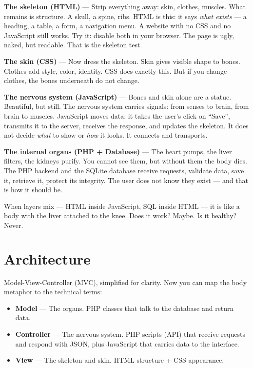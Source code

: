 \documentclass[11pt,a4paper,oneside]{book}
\providecommand{\tightlist}{%
  \setlength{\itemsep}{0pt}\setlength{\parskip}{0pt}}
\begin{document}
\textbf{The skeleton (HTML)} --- Strip everything away: skin,
clothes, muscles. What remains is structure. A skull, a spine,
ribs. HTML is this: it says \emph{what exists} --- a heading, a
table, a form, a navigation menu. A website with no CSS and no
JavaScript still works. Try it: disable both in your browser. The
page is ugly, naked, but readable. That is the skeleton test.

\textbf{The skin (CSS)} --- Now dress the skeleton. Skin gives
visible shape to bones. Clothes add style, color, identity. CSS
does exactly this. But if you change clothes, the bones
underneath do not change.

\textbf{The nervous system (JavaScript)} --- Bones and skin alone
are a statue. Beautiful, but still. The nervous system carries
signals: from senses to brain, from brain to muscles. JavaScript
moves data: it takes the user's click on ``Save'', transmits it
to the server, receives the response, and updates the skeleton.
It does not decide \emph{what} to show or \emph{how} it looks. It
connects and transports.

\textbf{The internal organs (PHP + Database)} --- The heart
pumps, the liver filters, the kidneys purify. You cannot see
them, but without them the body dies. The PHP backend and the
SQLite database receive requests, validate data, save it,
retrieve it, protect its integrity. The user does not know they
exist --- and that is how it should be.

When layers mix --- HTML inside JavaScript, SQL inside HTML ---
it is like a body with the liver attached to the knee. Does it
work? Maybe. Is it healthy? Never.

\hypertarget{architecture}{%
\section{Architecture}\label{architecture}}

Model-View-Controller (MVC), simplified for clarity. Now you can
map the body metaphor to the technical terms:

\begin{itemize}
\tightlist
\item
  \textbf{Model} --- The organs. PHP classes that talk to the
  database and return data.
\item
  \textbf{Controller} --- The nervous system. PHP scripts (API)
  that receive requests and respond with JSON, plus JavaScript
  that carries data to the interface.
\item
  \textbf{View} --- The skeleton and skin. HTML structure + CSS
  appearance.
\end{itemize}
\end{document}
